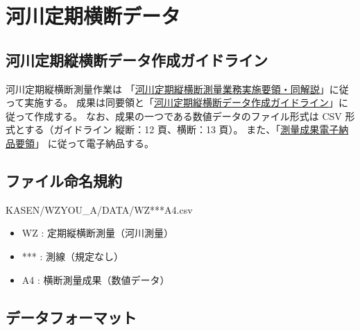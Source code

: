 \documentclass{jsarticle}
\providecommand{\tightlist}{\setlength{\itemsep}{0pt}\setlength{\parskip}{0pt}}
\begin{document}
 
\hypertarget{ux6cb3ux5dddux5b9aux671fux6a2aux65adux30c7ux30fcux30bf}{%
\section{河川定期横断データ}\label{ux6cb3ux5dddux5b9aux671fux6a2aux65adux30c7ux30fcux30bf}}

\hypertarget{ux6cb3ux5dddux5b9aux671fux7e26ux6a2aux65adux30c7ux30fcux30bfux4f5cux6210ux30acux30a4ux30c9ux30e9ux30a4ux30f3}{%
\subsection{河川定期縦横断データ作成ガイドライン}\label{ux6cb3ux5dddux5b9aux671fux7e26ux6a2aux65adux30c7ux30fcux30bfux4f5cux6210ux30acux30a4ux30c9ux30e9ux30a4ux30f3}}

河川定期縦横断測量作業は
「\href{https://www.mlit.go.jp/river/shishin_guideline/kasen/pdf/sokuryo_youryo.pdf}{河川定期縦横断測量業務実施要領・同解説}」に従って実施する。
成果は同要領と「\href{https://www.mlit.go.jp/river/shishin_guideline/kasen/gis/pdf_docs/juoudan/guideline0805.pdf}{河川定期縦横断データ作成ガイドライン}」に従って作成する。
なお、成果の一つである数値データのファイル形式は CSV
形式とする（ガイドライン 縦断：12 頁、横断：13 頁）。
また、「\href{http://www.cals-ed.go.jp/mg/wp-content/uploads/sokuryou50.pdf}{測量成果電子納品要領}」
に従って電子納品する。

\hypertarget{ux30d5ux30a1ux30a4ux30ebux547dux540dux898fux7d04}{%
\subsection{ファイル命名規約}\label{ux30d5ux30a1ux30a4ux30ebux547dux540dux898fux7d04}}

KASEN/WZYOU\_A/DATA/WZ***{A4}.csv

\begin{itemize}
\tightlist
\item
  WZ : 定期縦横断測量（河川測量）
\item
  *** : 測線（規定なし）
\item
  {A4} : 横断測量成果（数値データ）
\end{itemize}

\hypertarget{ux30c7ux30fcux30bfux30d5ux30a9ux30fcux30deux30c3ux30c8}{%
\subsection{データフォーマット}\label{ux30c7ux30fcux30bfux30d5ux30a9ux30fcux30deux30c3ux30c8}}
\end{document}
